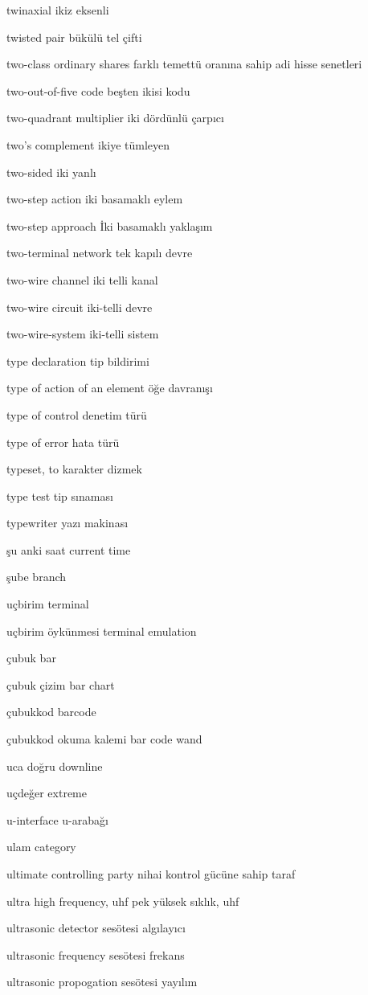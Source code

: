 \documentclass[12pt,fleqn]{article}\usepackage{../../common}
\begin{document}
twinaxial ikiz eksenli

twisted pair bükülü tel çifti

two-class ordinary shares farklı temettü oranına sahip adi hisse senetleri

two-out-of-five code beşten ikisi kodu

two-quadrant multiplier iki dördünlü çarpıcı

two's complement ikiye tümleyen

two-sided iki yanlı

two-step action iki basamaklı eylem

two-step approach İki basamaklı yaklaşım

two-terminal network tek kapılı devre

two-wire channel iki telli kanal

two-wire circuit iki-telli devre

two-wire-system iki-telli sistem

type declaration tip bildirimi

type of action of an element öğe davranışı

type of control denetim türü

type of error hata türü

typeset, to karakter dizmek

type test tip sınaması

typewriter yazı makinası

şu anki saat current time

şube branch

uçbirim terminal

uçbirim öykünmesi terminal emulation

çubuk bar

çubuk çizim bar chart

çubukkod barcode

çubukkod okuma kalemi bar code wand

uca doğru downline

uçdeğer extreme

u-interface u-arabağı

ulam category

ultimate controlling party nihai kontrol gücüne sahip taraf

ultra high frequency, uhf pek yüksek sıklık, uhf

ultrasonic detector sesötesi algılayıcı

ultrasonic frequency sesötesi frekans

ultrasonic propogation sesötesi yayılım
\end{document}
